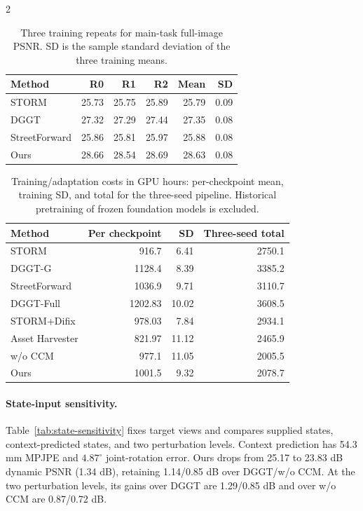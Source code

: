 \begin{multicols}{2}
\begin{table}[H]
\centering\small
\setlength{\tabcolsep}{4pt}
\caption{Three training repeats for main-task full-image PSNR. SD is the sample standard deviation of the three training means.}
\label{tab:main-training-seeds}
\begin{tabular}{@{}lrrrrr@{}}
\toprule
Method & R0 & R1 & R2 & Mean & SD \\
\midrule
STORM & 25.73 & 25.75 & 25.89 & 25.79 & 0.09 \\
DGGT & 27.32 & 27.29 & 27.44 & 27.35 & 0.08 \\
StreetForward & 25.86 & 25.81 & 25.97 & 25.88 & 0.08 \\
Ours & 28.66 & 28.54 & 28.69 & 28.63 & 0.08 \\
\bottomrule
\end{tabular}
\end{table}

\begin{table}[H]
\centering\small
\setlength{\tabcolsep}{4pt}
\caption{Training/adaptation costs in GPU hours: per-checkpoint mean, training SD, and total for the three-seed pipeline. Historical pretraining of frozen foundation models is excluded.}
\label{tab:training-cost-statistics}
\begin{tabular}{@{}lrrr@{}}
\toprule
Method & Per checkpoint & SD & Three-seed total \\
\midrule
STORM & 916.7 & 6.41 & 2750.1 \\
DGGT-G & 1128.4 & 8.39 & 3385.2 \\
StreetForward & 1036.9 & 9.71 & 3110.7 \\
DGGT-Full & 1202.83 & 10.02 & 3608.5 \\
STORM+Difix & 978.03 & 7.84 & 2934.1 \\
Asset Harvester & 821.97 & 11.12 & 2465.9 \\
w/o CCM & 977.1 & 11.05 & 2005.5 \\
Ours & 1001.5 & 9.32 & 2078.7 \\
\bottomrule
\end{tabular}
\end{table}

\paragraph{State-input sensitivity.}
Table~\ref{tab:state-sensitivity} fixes target views and compares supplied states, context-predicted states, and two perturbation levels. Context prediction has 54.3 mm MPJPE and $4.87^\circ$ joint-rotation error. Ours drops from 25.17 to 23.83 dB dynamic PSNR (1.34 dB), retaining 1.14/0.85 dB over DGGT/w/o CCM. At the two perturbation levels, its gains over DGGT are 1.29/0.85 dB and over w/o CCM are 0.87/0.72 dB.

\end{multicols}
